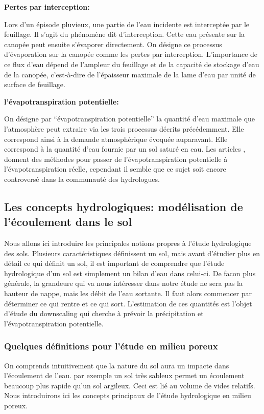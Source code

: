 \documentclass[a4paper,11pt]{article}
\numberwithin{equation}{section}
\begin{document}
\vspace{0.7cm}

\noindent\textbf{Pertes par interception:}

Lors d’un épisode pluvieux, une partie de l’eau incidente est interceptée par le feuillage. Il s’agit du phénomène dit d’interception. Cette eau présente sur la canopée peut ensuite s’évaporer directement. On désigne ce processus d’évaporation sur la canopée comme les pertes par interception. L’importance de ce flux d’eau dépend de l’ampleur du feuillage et de la capacité de stockage d’eau de la canopée, c’est-à-dire de l’épaisseur maximale de la lame d’eau par unité de surface de feuillage.

\vspace{0.7cm}

\noindent\textbf{l'évapotranspiration potentielle:}

On désigne par  ``évapotranspiration potentielle'' la quantité d’eau maximale que l’atmosphère peut extraire via les trois processus décrits précédemment. Elle correspond ainsi à la demande atmosphérique évoquée auparavant. Elle correspond à la quantité d'eau fournie par un sol saturé en eau. Les articles \cite{kristensen1975model}, \cite{zhifang2010estimation} donnent des méthodes pour passer de l'évapotranspiration potentielle à l'évapotranspiration réelle, cependant il semble que ce sujet soit encore controversé dans la communauté des hydrologues.  

\subsection{Les concepts hydrologiques: modélisation de l'écoulement dans le sol}
\label{hydro}

Nous allons ici introduire les principales notions propres à l'étude hydrologique des sols. Plusieurs caractéristiques définissent un sol, mais avant d'étudier  plus en détail ce qui définit un sol, il est important de comprendre que l'étude hydrologique d'un sol est simplement un bilan d'eau dans celui-ci. De facon plus générale, la grandeure qui va nous intéresser dans notre étude ne sera pas la hauteur de nappe, mais les débit de l'eau sortante.
Il faut alors commencer par déterminer ce qui rentre et ce qui sort. L'estimation de ces quantités est l'objet d'étude du downscaling qui cherche à prévoir la précipitation et l'évapotranspiration potentielle.

\subsubsection{Quelques définitions pour l'étude en milieu poreux}
\label{ch: definition milieu poreux}
On comprends intuitivement que la nature du sol aura un impacte dans l'écoulement de l'eau. par exemple un sol très sableux permet un écoulement beaucoup plus rapide qu'un sol argileux. Ceci est lié au volume de vides relatifs. Nous introduirons ici les concepts principaux de l'étude hydrologique en milieu poreux.
\end{document}
